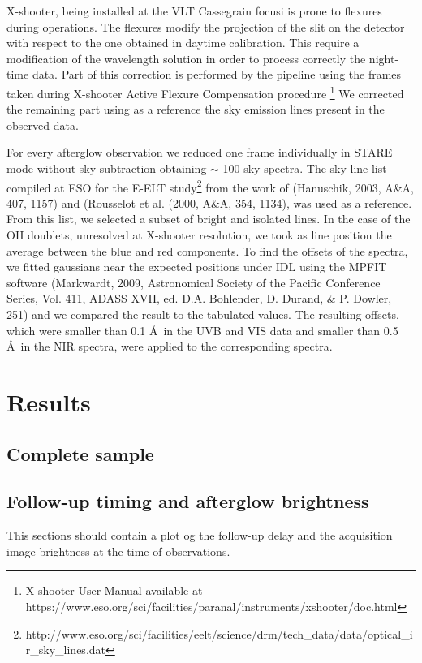 \documentclass[iop, twocolappendix, numberedappendix, tighten, appendixfloats]{emulateapj}
\begin{document}
	X-shooter, being installed at the VLT Cassegrain focusi is  prone to
	flexures during operations. The flexures modify the projection of the slit
	on the detector with respect to the one obtained in daytime calibration. 
	This require a modification of the wavelength solution in order to
	process correctly the night-time data. Part of this correction
	is performed by the pipeline using the frames taken
	during X-shooter Active Flexure Compensation procedure
	\footnote{X-shooter User Manual available at https://www.eso.org/sci/facilities/paranal/instruments/xshooter/doc.html}
	We corrected the remaining part using as a reference the sky
	emission lines present in the observed data.
	
	
	For every afterglow observation we reduced one frame individually in STARE mode without
	sky subtraction obtaining $\sim$ 100 sky spectra. The sky line list compiled at ESO for
	the E-ELT
	study\footnote{http://www.eso.org/sci/facilities/eelt/science/drm/tech\_data/data/optical\_ir\_sky\_lines.dat}
	from the work of (Hanuschik, 2003, A\&A, 407, 1157) and (Rousselot et al. (2000, A\&A, 354, 1134), was used as a reference.
	From this list, we selected a subset of bright and isolated lines. In the case of the OH doublets, unresolved at X-shooter resolution, we took as line position the average between the blue and red components. To find the offsets of the spectra, we fitted gaussians near the
	expected positions under IDL using the MPFIT software (Markwardt, 2009, Astronomical Society of the Pacific Conference Series, Vol. 411, ADASS XVII, ed. D.A. Bohlender, D. Durand, \& P. Dowler, 251) and we compared the result to the tabulated values.
	The resulting offsets, which were smaller than 0.1 \AA~in the UVB and VIS data
	and smaller than 0.5 \AA~in the NIR spectra, were applied to the corresponding spectra.

	
	\section{Results}
		
	
	\subsection{Complete sample}	
	
	
	\subsection{Follow-up timing and afterglow brightness}
	This sections should contain a plot og the follow-up delay and the acquisition image brightness at the time of observations. 
	
\end{document}
